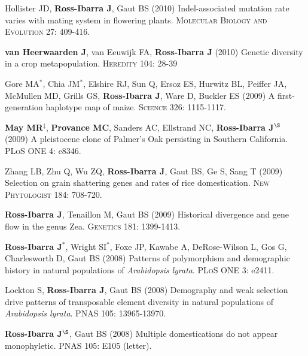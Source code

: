 \documentclass[letterpaper,10pt]{article}
\begin{document}
\begin{etaremune}
\item Hollister JD, {\bf Ross-Ibarra J}, Gaut BS (2010) Indel-associated mutation rate varies with mating system in flowering plants.  \textsc{Molecular Biology and Evolution} 27: 409-416.

\item {\bf van Heerwaarden J}, van Eeuwijk FA, {\bf Ross-Ibarra J} (2010) Genetic diversity in a crop metapopulation.  \textsc{Heredity} 104: 28-39


\item Gore MA$^*$, Chia JM$^*$, Elshire RJ, Sun Q, Ersoz ES, Hurwitz BL, Peiffer JA, McMullen MD, Grills GS, {\bf Ross-Ibarra J}, Ware D, Buckler ES (2009) A first-generation haplotype map of maize.  \textsc{Science 326}: 1115-1117.


\item {\bf May MR}$^\ddagger$, {\bf Provance MC}, Sanders AC, Ellstrand NC, {\bf Ross-Ibarra J}$^\S$ (2009) A pleistocene clone of Palmer's Oak persisting in Southern California.  \textsc{PLoS ONE} 4: e8346.


\item Zhang LB, Zhu Q, Wu ZQ, {\bf Ross-Ibarra J}, Gaut BS, Ge S, Sang T (2009) Selection on grain shattering genes and rates of rice domestication.  \textsc{New Phytologist} 184: 708-720.

\item {\bf Ross-Ibarra J}, Tenaillon M, Gaut BS (2009) Historical divergence and gene flow in the genus Zea.  \textsc{Genetics} 181: 1399-1413.


\item {\bf Ross-Ibarra J}$^*$, Wright SI$^*$, Foxe JP, Kawabe A, DeRose-Wilson L, Gos G, Charlesworth D, Gaut BS (2008) Patterns of polymorphism and demographic history in natural populations of \emph{Arabidopsis lyrata}.  \textsc{PLoS ONE} 3: e2411.


\item Lockton S, {\bf Ross-Ibarra J}, Gaut BS (2008) Demography and weak selection drive patterns of transposable element diversity in natural populations of \emph{Arabidopsis lyrata}. PNAS 105: 13965-13970.


\item {\bf Ross-Ibarra J}$^\S$, Gaut BS (2008) Multiple domestications do not appear monophyletic. PNAS 105: E105 (letter).



\end{etaremune}
\end{document}
